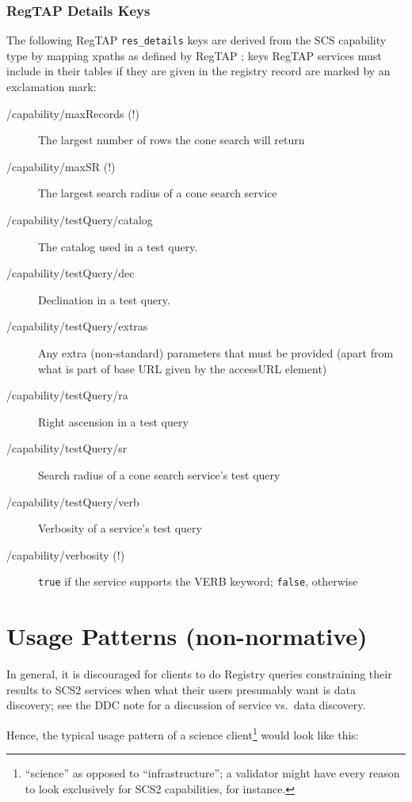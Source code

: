\documentclass[11pt,a4paper]{ivoa}
\begin{document}

\subsubsection{RegTAP Details Keys}

The following RegTAP \verb|res_details| keys are derived from the SCS
capability type by mapping xpaths as defined by RegTAP
\citep{2024ivoa.spec.1002D}; keys RegTAP
services must include in their tables if they are given in the registry
record are marked by an exclamation mark:

\begin{description}
\item[/capability/maxRecords (!)]The largest number of rows the cone
search will return
\item[/capability/maxSR (!)]The largest search radius of a cone search service
\item[/capability/testQuery/catalog]The catalog used in a test query.
\item[/capability/testQuery/dec]Declination in a test query.
\item[/capability/testQuery/extras]Any extra (non-standard) parameters
that must be provided (apart from what is part of base URL given by the
accessURL element)
\item[/capability/testQuery/ra]Right ascension in a test query
\item[/capability/testQuery/sr]Search radius of a cone search service's test query
\item[/capability/testQuery/verb]Verbosity of a service's test query
\item[/capability/verbosity (!)]\texttt{true} if the service supports the VERB keyword; \texttt{false}, otherwise
\end{description}


\appendix
\section{Usage Patterns (non-normative)}

In general, it is discouraged for clients to do Registry queries
constraining their results to SCS2 services
when what their users presumably want is
data discovery; see the DDC note \citep{2019ivoa.spec.0520D} for a
discussion of service vs.~data discovery.

Hence, the typical usage pattern of a science
client\footnote{``science'' as opposed to ``infrastructure''; a
validator might have every reason to look exclusively for SCS2
capabilities, for instance.} would look like this:
\end{document}
